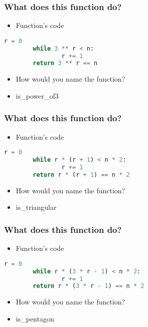 \documentclass[14pt]{beamer}
\begin{document}
    \begin{frame}[containsverbatim]
        \frametitle{What does this function do?}
        \begin{itemize}
        \item Function's code
        \end{itemize}
        \begin{lstlisting}[language=Python]
        r = 0
        while 3 ** r < n:
                r += 1
        return 3 ** r == n
        \end{lstlisting}
        \begin{itemize}
        \item \alert {How would you name the function?}
        \item is\_power\_of3
        \end{itemize}
    \end{frame}

    \begin{frame}[containsverbatim]
        \frametitle{What does this function do?}
        \begin{itemize}
        \item Function's code
        \end{itemize}
        \begin{lstlisting}[language=Python]
        r = 0
        while r * (r + 1) < n * 2:
                r += 1
        return r * (r + 1) == n * 2
        \end{lstlisting}
        \begin{itemize}
        \item \alert {How would you name the function?}
        \item is\_triangular
        \end{itemize}
    \end{frame}

    \begin{frame}[containsverbatim]
        \frametitle{What does this function do?}
        \begin{itemize}
        \item Function's code
        \end{itemize}
        \begin{lstlisting}[language=Python]
        r = 0
        while r * (3 * r - 1) < n * 2:
                r += 1
        return r * (3 * r - 1) == n * 2
        \end{lstlisting}
        \begin{itemize}
        \item \alert {How would you name the function?}
        \item is\_pentagon
        \end{itemize}
    \end{frame}
    
\end{document}
